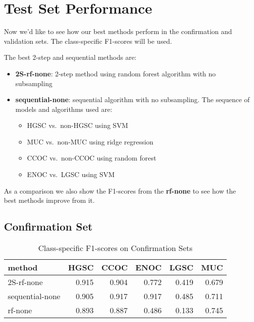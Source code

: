 \documentclass[
]{report}
\providecommand{\tightlist}{%
  \setlength{\itemsep}{0pt}\setlength{\parskip}{0pt}}
\begin{document}
\hypertarget{test-set-performance}{%
\section{Test Set Performance}\label{test-set-performance}}

Now we'd like to see how our best methods perform in the confirmation and validation sets. The class-specific F1-scores will be used.

The best 2-step and sequential methods are:

\begin{itemize}
\tightlist
\item
  \textbf{2S-rf-none}: 2-step method using random forest algorithm with no subsampling
\item
  \textbf{sequential-none}: sequential algorithm with no subsampling. The sequence of models and algorithms used are:

  \begin{itemize}
  \tightlist
  \item
    HGSC vs.~non-HGSC using SVM
  \item
    MUC vs.~non-MUC using ridge regression
  \item
    CCOC vs.~non-CCOC using random forest
  \item
    ENOC vs.~LGSC using SVM
  \end{itemize}
\end{itemize}

As a comparison we also show the F1-scores from the \textbf{rf-none} to see how the best methods improve from it.

\hypertarget{confirmation-set}{%
\subsection{Confirmation Set}\label{confirmation-set}}

\begin{table}

\caption{\label{tab:confirmation-set}Class-specific F1-scores on Confirmation Sets}
\centering
\begin{tabular}[t]{l|r|r|r|r|r}
\hline
method & HGSC & CCOC & ENOC & LGSC & MUC\\
\hline
2S-rf-none & 0.915 & 0.904 & 0.772 & 0.419 & 0.679\\
\hline
sequential-none & 0.905 & 0.917 & 0.917 & 0.485 & 0.711\\
\hline
rf-none & 0.893 & 0.887 & 0.486 & 0.133 & 0.745\\
\hline
\end{tabular}
\end{table}
\end{document}
